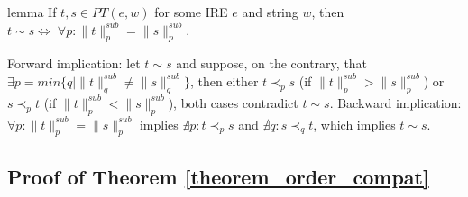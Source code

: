 \documentclass[AMA,STIX1COL]{WileyNJD-v2}
\newcommand{\PT}{PT}
\newcommand{\snorm}[2]{\|{#1}\|^{sub}_{#2}}
\begin{document}
\begin{theoremEnd}{lemma}
    \label{lemma_incomparability_equivdef}
    If $t, s \in \PT(e, w)$ for some IRE $e$ and string $w$,
    then $t \sim s \Leftrightarrow \; \forall p : \snorm{t}{p} = \snorm{s}{p}$.
\end{theoremEnd}
\begin{proofEnd}
    Forward implication: let $t \sim s$ and suppose, on the contrary, that $\exists p = min \{ q \mid \snorm{t}{q} \neq \snorm{s}{q} \}$,
    then either $t \prec_p s$ (if $\snorm{t}{p} > \snorm{s}{p}$) or $s \prec_p t$ (if $\snorm{t}{p} < \snorm{s}{p}$),
    both cases contradict $t \sim s$.
    Backward implication: $\forall p : \snorm{t}{p} = \snorm{s}{p}$
    implies $\nexists p : t \prec_p s$ and $\nexists q : s \prec_q t$,
    which implies $t \sim s$.
\end{proofEnd}



\subsection*{Proof of Theorem \ref{theorem_order_compat}}
\end{document}
